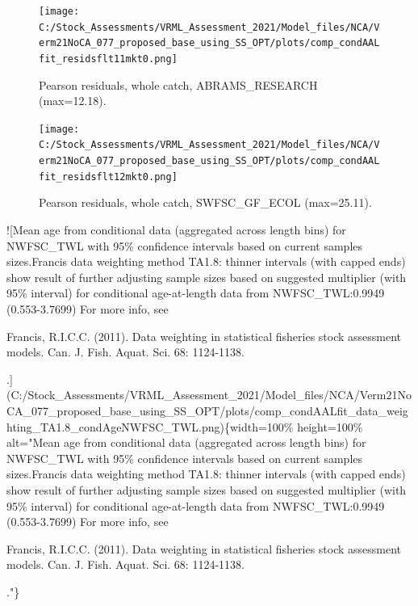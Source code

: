 \documentclass[11pt,
  english,
  a4paper,
]{article}
\begin{document}
\begin{figure}
\centering
\texttt{[image: C:/Stock\_Assessments/VRML\_Assessment\_2021/Model\_files/NCA/Verm21NoCA\_077\_proposed\_base\_using\_SS\_OPT/plots/comp\_condAALfit\_residsflt11mkt0.png]}
\caption{Pearson residuals, whole catch, ABRAMS\_RESEARCH (max=12.18).\label{fig:comp_condAALfit_residsflt11mkt0}}
\end{figure}

\begin{figure}
\centering
\texttt{[image: C:/Stock\_Assessments/VRML\_Assessment\_2021/Model\_files/NCA/Verm21NoCA\_077\_proposed\_base\_using\_SS\_OPT/plots/comp\_condAALfit\_residsflt12mkt0.png]}
\caption{Pearson residuals, whole catch, SWFSC\_GF\_ECOL (max=25.11).\label{fig:comp_condAALfit_residsflt12mkt0}}
\end{figure}

!{[}Mean age from conditional data (aggregated across length bins) for NWFSC\_TWL with 95\% confidence intervals based on current samples sizes.Francis data weighting method TA1.8: thinner intervals (with capped ends) show result of further adjusting sample sizes based on suggested multiplier (with 95\% interval) for conditional age-at-length data from NWFSC\_TWL:0.9949 (0.553-3.7699) For more info, see

Francis, R.I.C.C. (2011). Data weighting in statistical fisheries stock assessment models. Can. J. Fish. Aquat. Sci. 68: 1124-1138.

.\label{fig:comp_condAALfit_data_weighting_TA1.8_condAgeNWFSC_TWL}{]}(C:/Stock\_Assessments/VRML\_Assessment\_2021/Model\_files/NCA/Verm21NoCA\_077\_proposed\_base\_using\_SS\_OPT/plots/comp\_condAALfit\_data\_weighting\_TA1.8\_condAgeNWFSC\_TWL.png)\{width=100\% height=100\% alt="Mean age from conditional data (aggregated across length bins) for NWFSC\_TWL with 95\% confidence intervals based on current samples sizes.Francis data weighting method TA1.8: thinner intervals (with capped ends) show result of further adjusting sample sizes based on suggested multiplier (with 95\% interval) for conditional age-at-length data from NWFSC\_TWL:0.9949 (0.553-3.7699) For more info, see

Francis, R.I.C.C. (2011). Data weighting in statistical fisheries stock assessment models. Can. J. Fish. Aquat. Sci. 68: 1124-1138.

."\}
\end{document}
